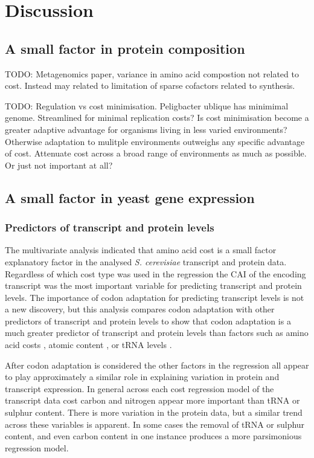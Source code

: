 \clearpage

\section{Discussion}

\subsection{A small factor in protein composition}

TODO: Metagenomics paper, variance in amino acid compostion not related to cost. Instead may related to limitation of sparse cofactors related to synthesis.

TODO: Regulation vs cost minimisation. Peligbacter ublique has minimimal genome. Streamlined for minimal replication costs? Is cost minimisation become a greater adaptive advantage for organisms living in less varied environments? Otherwise adaptation to mulitple environments outweighs any specific advantage of cost. Attenuate cost across a broad range of environments as much as possible. Or just not important at all?

\subsection{A small factor in yeast gene expression}

\subsubsection{Predictors of transcript and protein levels}

The multivariate analysis indicated that amino acid cost is a small factor explanatory factor in the analysed \emph{S. cerevisiae} transcript and protein data. Regardless of which cost type was used in the regression the CAI of the encoding transcript was the most important variable for predicting transcript and protein levels. The importance of codon adaptation for predicting transcript levels is not a new discovery, but this analysis compares codon adaptation with other predictors of transcript and protein levels to show that codon adaptation is a much greater predictor of transcript and protein levels than factors such as amino acid costs \cite{akashi2002}, atomic content \cite{atomic_content}, or tRNA levels \cite{akashi_trna}.

After codon adaptation is considered the other factors in the regression all appear to play approximately a similar role in explaining variation in protein and transcript expression. In general across each cost regression model of the transcript data cost carbon and nitrogen appear more important than tRNA or sulphur content. There is more variation in the protein data, but a similar trend across these variables is apparent. In some cases the removal of tRNA or sulphur content, and even carbon content in one instance produces a more parsimonious regression model. 

